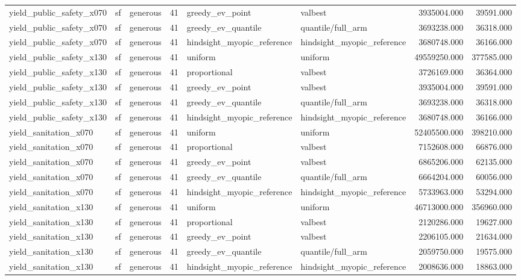 \begin{tabular}{lllrllrr}
yield\_public\_safety\_x070 & sf & generous & 41 & greedy\_ev\_point & valbest & 3935004.000 & 39591.000 \\
yield\_public\_safety\_x070 & sf & generous & 41 & greedy\_ev\_quantile & quantile/full\_arm & 3693238.000 & 36318.000 \\
yield\_public\_safety\_x070 & sf & generous & 41 & hindsight\_myopic\_reference & hindsight\_myopic\_reference & 3680748.000 & 36166.000 \\
yield\_public\_safety\_x130 & sf & generous & 41 & uniform & uniform & 49559250.000 & 377585.000 \\
yield\_public\_safety\_x130 & sf & generous & 41 & proportional & valbest & 3726169.000 & 36364.000 \\
yield\_public\_safety\_x130 & sf & generous & 41 & greedy\_ev\_point & valbest & 3935004.000 & 39591.000 \\
yield\_public\_safety\_x130 & sf & generous & 41 & greedy\_ev\_quantile & quantile/full\_arm & 3693238.000 & 36318.000 \\
yield\_public\_safety\_x130 & sf & generous & 41 & hindsight\_myopic\_reference & hindsight\_myopic\_reference & 3680748.000 & 36166.000 \\
yield\_sanitation\_x070 & sf & generous & 41 & uniform & uniform & 52405500.000 & 398210.000 \\
yield\_sanitation\_x070 & sf & generous & 41 & proportional & valbest & 7152608.000 & 66876.000 \\
yield\_sanitation\_x070 & sf & generous & 41 & greedy\_ev\_point & valbest & 6865206.000 & 62135.000 \\
yield\_sanitation\_x070 & sf & generous & 41 & greedy\_ev\_quantile & quantile/full\_arm & 6664204.000 & 60056.000 \\
yield\_sanitation\_x070 & sf & generous & 41 & hindsight\_myopic\_reference & hindsight\_myopic\_reference & 5733963.000 & 53294.000 \\
yield\_sanitation\_x130 & sf & generous & 41 & uniform & uniform & 46713000.000 & 356960.000 \\
yield\_sanitation\_x130 & sf & generous & 41 & proportional & valbest & 2120286.000 & 19627.000 \\
yield\_sanitation\_x130 & sf & generous & 41 & greedy\_ev\_point & valbest & 2206105.000 & 21634.000 \\
yield\_sanitation\_x130 & sf & generous & 41 & greedy\_ev\_quantile & quantile/full\_arm & 2059750.000 & 19575.000 \\
yield\_sanitation\_x130 & sf & generous & 41 & hindsight\_myopic\_reference & hindsight\_myopic\_reference & 2008636.000 & 18863.000 \\

\end{tabular}

